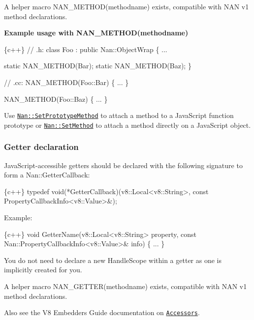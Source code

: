 A helper macro {\ttfamily N\+A\+N\+\_\+\+M\+E\+T\+H\+O\+D(methodname)} exists, compatible with N\+AN v1 method declarations.

{\bfseries Example usage with {\ttfamily N\+A\+N\+\_\+\+M\+E\+T\+H\+O\+D(methodname)}}


\begin{DoxyCode}
\{c++\}
// .h:
class Foo : public Nan::ObjectWrap \{
  ...

  static NAN\_METHOD(Bar);
  static NAN\_METHOD(Baz);
\}


// .cc:
NAN\_METHOD(Foo::Bar) \{
  ...
\}

NAN\_METHOD(Foo::Baz) \{
  ...
\}
\end{DoxyCode}


Use \href{#api_nan_set_prototype_method}{\tt {\ttfamily Nan\+::\+Set\+Prototype\+Method}} to attach a method to a Java\+Script function prototype or \href{#api_nan_set_method}{\tt {\ttfamily Nan\+::\+Set\+Method}} to attach a method directly on a Java\+Script object.

\label{_api_nan_getter}%
 \subsubsection*{Getter declaration}

Java\+Script-\/accessible getters should be declared with the following signature to form a {\ttfamily Nan\+::\+Getter\+Callback}\+:


\begin{DoxyCode}
\{c++\}
typedef void(*GetterCallback)(v8::Local<v8::String>,
                              const PropertyCallbackInfo<v8::Value>&);
\end{DoxyCode}


Example\+:


\begin{DoxyCode}
\{c++\}
void GetterName(v8::Local<v8::String> property,
                const Nan::PropertyCallbackInfo<v8::Value>& info) \{
  ...
\}
\end{DoxyCode}


You do not need to declare a new {\ttfamily Handle\+Scope} within a getter as one is implicitly created for you.

A helper macro {\ttfamily N\+A\+N\+\_\+\+G\+E\+T\+T\+E\+R(methodname)} exists, compatible with N\+AN v1 method declarations.

Also see the V8 Embedders Guide documentation on \href{https://developers.google.com/v8/embed#accesssors}{\tt Accessors}.


